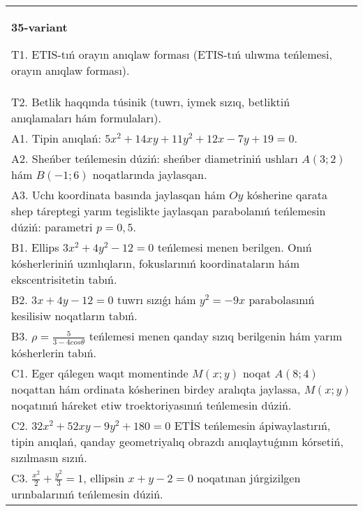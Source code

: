 \documentclass{article}
\begin{document}
\begin{tabular}{m{17cm}}
\textbf{35-variant}
\newline

T1. ETIS-tıń orayın anıqlaw forması (ETIS-tıń ulıwma teńlemesi, orayın anıqlaw forması).\\

T2. Betlik haqqında túsinik (tuwrı, iymek sızıq, betliktiń anıqlamaları hám formulaları).\\

A1. Tipin anıqlań: $5 x^{2}+14 xy+11 y^{2}+12 x-7 y+19=0$.\\

A2. Sheńber teńlemesin dúziń: sheńber diametriniń ushları $A (3;2) $ hám $B (-1;6 ) $ noqatlarında jaylasqan.\\

A3. Uchı koordinata basında jaylasqan hám $Oy$ kósherine qarata shep táreptegi yarım tegislikte jaylasqan parabolanıń teńlemesin dúziń: parametri $p=0,5$.\\

B1. Ellips $3x^{2} + 4y^{2} - 12 = 0$ teńlemesi menen berilgen. Onıń kósherleriniń uzınlıqların, fokuslarınıń koordinataların hám ekscentrisitetin tabıń.  \\

B2. $3x + 4y - 12 = 0$ tuwrı sızıǵı hám $y^{2} = - 9x$ parabolasınıń kesilisiw noqatların tabıń.  \\

B3. $\rho = \frac{5}{3 - 4cos\theta}$ teńlemesi menen qanday sızıq berilgenin hám yarım kósherlerin tabıń.  \\

C1. Eger qálegen waqıt momentinde $M(x;y)$ noqat $A(8;4)$ noqattan hám ordinata kósherinen birdey aralıqta jaylassa, $M(x;y)$ noqatınıń háreket etiw troektoriyasınıń teńlemesin dúziń.  \\

C2. $32x^{2} + 52xy - 9y^{2} + 180 = 0$ ETİS teńlemesin ápiwaylastırıń, tipin anıqlań, qanday geometriyalıq obrazdı anıqlaytuǵının kórsetiń, sızılmasın sızıń.  \\

C3. $\frac{x^{2}}{2} + \frac{y^{2}}{3} = 1$, ellipsin $x + y - 2 = 0$ noqatınan júrgizilgen urınbalarınıń teńlemesin dúziń.  \\

\end{tabular}
\vspace{1cm}
\end{document}
